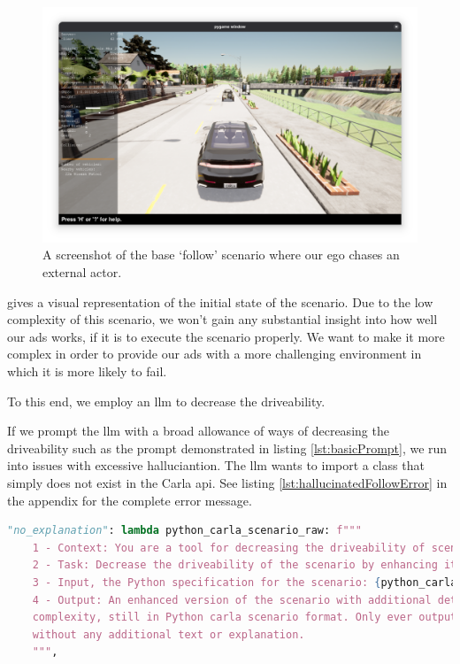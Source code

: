 \begin{figure}[htbp]
    \centering
    \includegraphics[width=\textwidth]{experiment-material/follow-base-startpoint.png}
    \caption{A screenshot of the base `follow' scenario where our ego chases an external actor.}\label{fig:followBaseStartpoint}
\end{figure}

 gives a visual representation of the initial state of the scenario.
Due to the low complexity of this scenario, we won't gain any substantial insight into how well our
\acrshort{ads} works, if it is to execute the scenario properly. We want to make it more complex in
order to provide our \acrshort{ads} with a more challenging environment in which it is more likely
to fail.

To this end, we employ an \acrshort{llm} to decrease the driveability.

If we prompt the \acrshort{llm} with a broad allowance of ways of decreasing the driveability such
as the prompt demonstrated in listing \ref{lst:basicPrompt}, we run into issues with excessive
halluciantion. The \acrshort{llm} wants to import a class that simply does not exist in the Carla
\acrshort{api}. See listing \ref{lst:hallucinatedFollowError} in the  appendix for the complete error message.


\begin{lstlisting}[language=python, label={lst:basicPrompt}, caption={The most basic prompt first used in the experiments. This leads to excessive halluciantion.}]
            "no_explanation": lambda python_carla_scenario_raw: f"""
    1 - Context: You are a tool for decreasing the driveability of scenarios in the driving simulator Carla.
    2 - Task: Decrease the driveability of the scenario by enhancing it with more details and complexity.
    3 - Input, the Python specification for the scenario: {python_carla_scenario_raw}
    4 - Output: An enhanced version of the scenario with additional details and
    complexity, still in Python carla scenario format. Only ever output the code,
    without any additional text or explanation.
    """,
\end{lstlisting}


